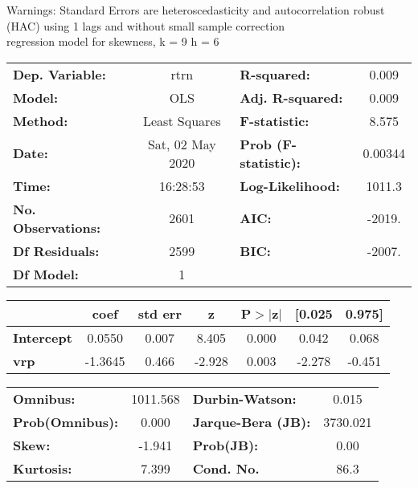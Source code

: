 Warnings: \newline
 [1] Standard Errors are heteroscedasticity and autocorrelation robust (HAC) using 1 lags and without small sample correction\\ 

regression model for skewness, k = 9 h = 6\begin{center}
\begin{tabular}{lclc}
\toprule
\textbf{Dep. Variable:}    &       rtrn       & \textbf{  R-squared:         } &     0.009   \\
\textbf{Model:}            &       OLS        & \textbf{  Adj. R-squared:    } &     0.009   \\
\textbf{Method:}           &  Least Squares   & \textbf{  F-statistic:       } &     8.575   \\
\textbf{Date:}             & Sat, 02 May 2020 & \textbf{  Prob (F-statistic):} &  0.00344    \\
\textbf{Time:}             &     16:28:53     & \textbf{  Log-Likelihood:    } &    1011.3   \\
\textbf{No. Observations:} &        2601      & \textbf{  AIC:               } &    -2019.   \\
\textbf{Df Residuals:}     &        2599      & \textbf{  BIC:               } &    -2007.   \\
\textbf{Df Model:}         &           1      & \textbf{                     } &             \\
\bottomrule
\end{tabular}
\begin{tabular}{lcccccc}
                   & \textbf{coef} & \textbf{std err} & \textbf{z} & \textbf{P$> |$z$|$} & \textbf{[0.025} & \textbf{0.975]}  \\
\midrule
\textbf{Intercept} &       0.0550  &        0.007     &     8.405  &         0.000        &        0.042    &        0.068     \\
\textbf{vrp}       &      -1.3645  &        0.466     &    -2.928  &         0.003        &       -2.278    &       -0.451     \\
\bottomrule
\end{tabular}
\begin{tabular}{lclc}
\textbf{Omnibus:}       & 1011.568 & \textbf{  Durbin-Watson:     } &    0.015  \\
\textbf{Prob(Omnibus):} &   0.000  & \textbf{  Jarque-Bera (JB):  } & 3730.021  \\
\textbf{Skew:}          &  -1.941  & \textbf{  Prob(JB):          } &     0.00  \\
\textbf{Kurtosis:}      &   7.399  & \textbf{  Cond. No.          } &     86.3  \\
\bottomrule
\end{tabular}
\end{center}

